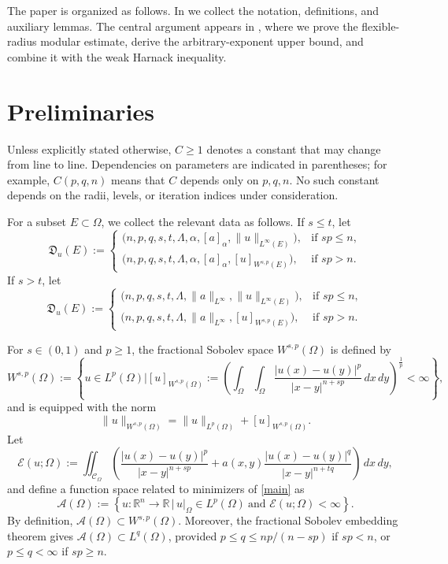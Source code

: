 \documentclass[reqno]{amsart}
\theoremstyle{plain}
\theoremstyle{definition}
\theoremstyle{remark}
\numberwithin{equation}{section}
\begin{document}
The paper is organized as follows. In  we collect the
notation, definitions, and auxiliary lemmas. The central argument appears in
, where we prove the flexible-radius modular estimate,
derive the arbitrary-exponent upper bound, and combine it with the weak
Harnack inequality.


\section{Preliminaries}
\label{sec:algebra-euler}


Unless explicitly stated otherwise, \(C\ge1\) denotes a constant that may
change from line to line. Dependencies on parameters are indicated in
parentheses; for example, \(C(p,q,n)\) means that \(C\) depends only on
\(p,q,n\). No such constant depends on the radii, levels, or iteration indices
under consideration.

For a subset \(E\subset\Omega\), we collect the relevant data as follows. If
\(s\le t\), let
\begin{equation*}
\mathfrak D_u(E):=\begin{cases}
\bigl(n,p,q,s,t,\Lambda,\alpha,[a]_\alpha,\|u\|_{L^\infty(E)}\bigr),
   &\text{if } sp\le n,\\[2mm]
\bigl(n,p,q,s,t,\Lambda,\alpha,[a]_\alpha,[u]_{W^{s,p}(E)}\bigr),
   &\text{if } sp> n.
\end{cases}
\end{equation*}
If \(s>t\), let
\begin{equation*}
\mathfrak D_u(E):=\begin{cases}
\bigl(n,p,q,s,t,\Lambda,\|a\|_{L^\infty},\|u\|_{L^\infty(E)}\bigr),
   &\text{if } sp\le n,\\[2mm]
\bigl(n,p,q,s,t,\Lambda,\|a\|_{L^\infty},[u]_{W^{s,p}(E)}\bigr),
   &\text{if } sp> n.
\end{cases}
\end{equation*}

For \(s\in(0,1)\) and \(p\ge1\), the fractional Sobolev space
\(W^{s,p}(\Omega)\) is defined by
\[
W^{s,p}(\Omega):=\left\{u\in L^p(\Omega)\Bigg|[u]_{W^{s,p}(\Omega)}:=\left(\int_\Omega\int_\Omega\frac{|u(x)-u(y)|^p}{|x-y|^{n+sp}}\,dx\,dy\right)^\frac{1}{p}<\infty\right\},
\]
and is equipped with the norm
\[
\|u\|_{W^{s,p}(\Omega)}=\|u\|_{L^p(\Omega)}+[u]_{W^{s,p}(\Omega)}.
\]
Let
\[
\mathcal{E}(u;\Omega):=\iint_{\mathcal{C}_\Omega}\left(\frac{|u(x)-u(y)|^p}{|x-y|^{n+sp}}+a(x,y)\frac{|u(x)-u(y)|^q}{|x-y|^{n+tq}}\right)\,dx\,dy,
\]
and define a function space related to minimizers of \eqref{main} as
\[
\mathcal{A}(\Omega):=\left\{u:\mathbb{R}^n\rightarrow\mathbb{R} \,\Big|\, u|_\Omega\in L^p(\Omega) \ \text{and } \mathcal{E}(u;\Omega)<\infty\right\}.
\]
By definition, \(\mathcal{A}(\Omega)\subset W^{s,p}(\Omega)\). Moreover, the
fractional Sobolev embedding theorem gives
\(\mathcal{A}(\Omega)\subset L^q(\Omega)\), provided
\(p\le q\le np/(n-sp)\) if \(sp<n\), or \(p\le q<\infty\) if \(sp\ge n\).
\end{document}

